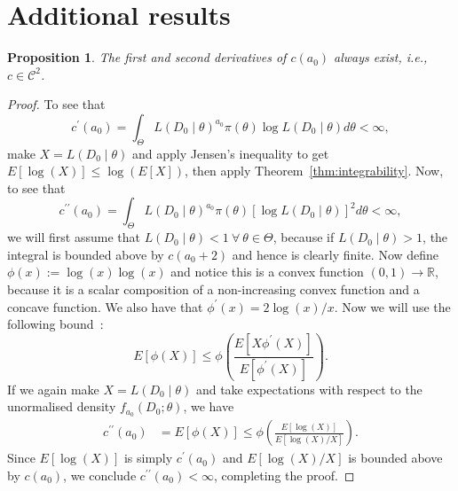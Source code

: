 \documentclass[a4paper, notitlepage, 11pt]{article}
\newtheorem{proposition}{Proposition}[]
\begin{document}


\appendix

\section{Additional results}
\label{sec:further_proofs}

\begin{proposition}
\label{prop:c_is_C2}
The first and second derivatives of $c(a_0)$ always exist, i.e., $c \in \mathcal{C}^2$. 
\end{proposition}
\begin{proof}
To see that
\[c^\prime(a_0) = \int_{\Theta} L(D_0\mid\theta)^{a_0} \pi(\theta) \log L(D_0\mid\theta) d\theta < \infty, \]
make $ X = L( D_0 \mid \theta)$ and  apply Jensen's inequality to get $E[\log(X)] \leq \log\left(E[X]\right)$, then apply Theorem~\ref{thm:integrability}.
Now, to see that 
\[ c^{\prime\prime}(a_0) = \int_{\Theta} L(D_0\mid\theta)^{a_0} \pi(\theta) [\log L(D_0\mid\theta)]^2 d\theta < \infty, \]
we will first assume that $L(D_0 \mid \theta) < 1 \: \forall\: \theta \in \Theta$, because if $L(D_0 \mid \theta) > 1$, the integral is bounded above by $c(a_0 + 2)$ and hence is clearly finite.
Now define $\phi(x) := \log(x)\log(x)$ and notice this is a convex function $(0, 1) \to \mathbb{R}$, because it is a scalar composition of a non-increasing convex function and a concave function.
We also have that $\phi^\prime(x) = 2\log(x)/x$.
Now we will use the following bound~\citep[Theorem 2.1 and Remark 2.1 (ii)]{Birge1989}:
\begin{equation}
 \label{eq:convex_func_expectation_bound}
 E[\phi(X)] \leq \phi\left(\frac{E\left[X\phi^\prime(X)\right]}{E[\phi^\prime(X)]}\right).
\end{equation}
If we again make $X = L(D_0 \mid \theta)$ and take expectations with respect to the unormalised density $f_{a_0}(D_0; \theta)$, we have
\begin{align*}
 c^{\prime\prime}(a_0) &= E[\phi(X)] \leq \phi\left(\frac{E\left[\log(X)\right]}{E[\log(X)/X]}\right).
\end{align*}
Since $E\left[\log(X)\right]$ is simply $c^\prime(a_0)$ and $E[\log(X)/X]$ is bounded above by $c(a_0)$, we conclude $c^{\prime\prime}(a_0) < \infty$, completing the proof.
\end{proof}
\end{document}
